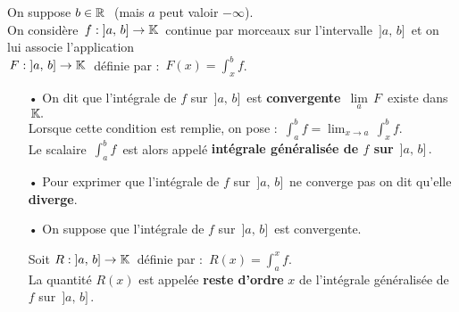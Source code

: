 On suppose \(b\in\mathbb{R}\ \) (mais $a$ peut valoir \(-\infty\)).\vspace{0.2cm}\\
On considère \(\,f:\;]a,\,b]\to\mathbb{K}\,\) continue par morceaux sur l'intervalle \(\,]a,\,b]\,\) et on lui associe l'application\vspace{0.1cm}\\
\(\,F:\;]a,\,b]\to\mathbb{K}\;\) définie par : \(\,\displaystyle F(x)=\int_{x}^{b}f\).
\begin{itemize}[leftmargin=0.5cm]
    \item[•] On dit que l'intégrale de $f$ sur \(\,]a,\,b]\,\) est \textbf{convergente} \ssi \(\,\underset{a}{\lim}\,F\,\) existe dans \(\,\mathbb{K}.\)\\
    Lorsque cette condition est remplie, on pose : \(\,\displaystyle \int_{a}^{b}\!f=\lim_{x\to a}\,\int_{x}^{b}\!f\).\\
    Le scalaire \(\,\displaystyle \int_{a}^{b}\!f\,\) est alors appelé \textbf{intégrale généralisée de $f$ sur} \(\,]a,\,b]\,.\)\vspace{0.2cm}

    \item[•] Pour exprimer que l'intégrale de $f$ sur \(\,]a,\,b]\,\) ne converge pas on dit qu'elle \textbf{diverge}.\vspace{0.4cm}
    
    \item[•] On suppose que l'intégrale de $f$ sur \(\,]a,\,b]\,\) est convergente.\vspace{-0.2cm}
    
    \hspace{4cm}Soit \(R:\;]a,\,b]\to\mathbb{K}\,\) définie par : \(\,\displaystyle R(x)=\int_{a}^{x}\!f\).\vspace{0.1cm}\\
    La quantité \(R(x)\) est appelée \textbf{reste d'ordre} $x$ de l'intégrale généralisée de $f$ sur \(\,]a,\,b]\,\).
\end{itemize}

\newpage

